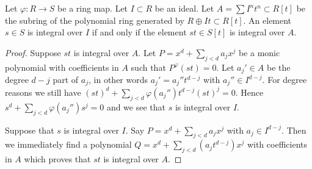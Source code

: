 \begin{lemma}
\label{lemma-characterize-integral-ideal}
Let $\varphi : R \to S$ be a ring map.
Let $I \subset R$ be an ideal.
Let $A = \sum I^nt^n \subset R[t]$ be the
subring of the polynomial ring
generated by $R \oplus It \subset R[t]$.
An element $s \in S$ is integral over $I$ if
and only if the element $st \in S[t]$
is integral over $A$.
\end{lemma}

\begin{proof}
Suppose $st$ is integral over $A$.
Let $P = x^d + \sum_{j < d} a_j x^j$
be a monic polynomial with coefficients in $A$
such that $P^\varphi(st) = 0$. Let $a_j' \in A$
be the degree $d-j$ part of $a_j$, in other
words $a_j' = a_j'' t^{d-j}$ with $a_j'' \in I^{d-j}$.
For degree reasons we still have
$(st)^d + \sum_{j < d} \varphi(a_j'') t^{d-j} (st)^j = 0$.
Hence $s^d + \sum_{j < d} \varphi(a_j'') s^j = 0$
and we see that $s$ is integral over $I$.

\medskip\noindent
Suppose that $s$ is integral over $I$.
Say $P = x^d + \sum_{j < d} a_j x^j$
with $a_j \in I^{d-j}$. Then we immediately find a
polynomial $Q = x^d + \sum_{j < d} (a_j t^{d-j}) x^j$
with coefficients in $A$ which proves that
$st$ is integral over $A$.
\end{proof}